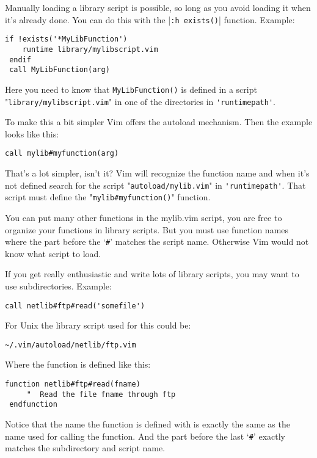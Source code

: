 Manually loading a library script is possible, so long as you avoid loading it when it's already done.
You can do this with the |\verb!:h exists()!| function.
Example:

\begin{Verbatim}[samepage=true]
 if !exists('*MyLibFunction')
    runtime library/mylibscript.vim
 endif
 call MyLibFunction(arg)
\end{Verbatim}

Here you need to know that \verb!MyLibFunction()! is defined in a script "\verb!library/mylibscript.vim!" in one of the directories in \verb!'runtimepath'!.

To make this a bit simpler Vim offers the autoload mechanism.
Then the example looks like this:

\begin{Verbatim}[samepage=true]
 call mylib#myfunction(arg)
\end{Verbatim}

That's a lot simpler, isn't it?
Vim will recognize the function name and when it's not defined search for the script "\verb!autoload/mylib.vim!" in \verb!'runtimepath'!.
That script must define the "\verb!mylib#myfunction()!" function.

You can put many other functions in the mylib.vim script, you are free to organize your functions in library scripts.
But you must use function names where the part before the `\verb!#!' matches the script name.
Otherwise Vim would not know what script to load.

If you get really enthusiastic and write lots of library scripts, you may want to use subdirectories.
Example:

\begin{Verbatim}[samepage=true]
 call netlib#ftp#read('somefile')
\end{Verbatim}

For Unix the library script used for this could be:

\begin{Verbatim}[samepage=true]
    ~/.vim/autoload/netlib/ftp.vim
\end{Verbatim}

Where the function is defined like this:

\begin{Verbatim}[samepage=true]
 function netlib#ftp#read(fname)
     "  Read the file fname through ftp
 endfunction
\end{Verbatim}

Notice that the name the function is defined with is exactly the same as the name used for calling the function.
And the part before the last `\verb!#!' exactly matches the subdirectory and script name.

